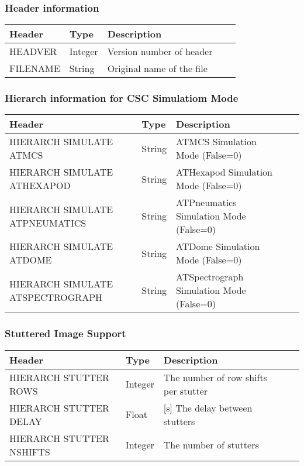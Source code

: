\subsubsection{Header information}


\begin{tabular}{l l l l l}
\hline
Header & Type & Description \\
\hline
HEADVER & Integer & Version number of header \\
FILENAME & String & Original name of the file \\
\hline
\end{tabular}


\subsubsection{Hierarch information for CSC Simulatiom Mode}


\begin{tabular}{l l l l l}
\hline
Header & Type & Description \\
\hline
HIERARCH SIMULATE ATMCS & String & ATMCS Simulation Mode (False=0) \\
HIERARCH SIMULATE ATHEXAPOD & String & ATHexapod Simulation Mode (False=0) \\
HIERARCH SIMULATE ATPNEUMATICS & String & ATPneumatics Simulation Mode (False=0) \\
HIERARCH SIMULATE ATDOME & String & ATDome Simulation Mode (False=0) \\
HIERARCH SIMULATE ATSPECTROGRAPH & String & ATSpectrograph Simulation Mode (False=0) \\
\hline
\end{tabular}


\subsubsection{Stuttered Image Support}


\begin{tabular}{l l l l l}
\hline
Header & Type & Description \\
\hline
HIERARCH STUTTER ROWS & Integer & The number of row shifts per stutter \\
HIERARCH STUTTER DELAY & Float & [s] The delay between stutters \\
HIERARCH STUTTER NSHIFTS & Integer & The number of stutters \\
\hline
\end{tabular}

